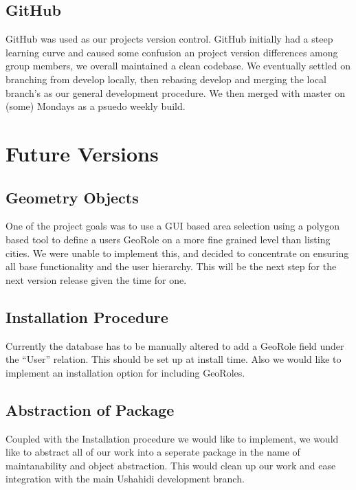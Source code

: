 \documentclass{article}
\begin{document}
\subsection{GitHub}
GitHub was used as our projects version control. GitHub initially had a steep learning curve and caused some confusion an project version differences among group members, we overall maintained a clean codebase. We eventually settled on branching from develop locally, then rebasing develop and merging the local branch's as our general development procedure. We then merged with master on (some) Mondays as a psuedo weekly build.

\section{Future Versions}
\subsection{Geometry Objects}
One of the project goals was to use a GUI based area selection using a polygon based tool to define a users GeoRole on a more fine grained level than listing cities. We were unable to implement this, and decided to concentrate on ensuring all base functionality and the user hierarchy. This will be the next step for the next version release given the time for one.

\subsection{Installation Procedure}
Currently the database has to be manually altered to add a GeoRole field under the ``User'' relation. This should be set up at install time. Also we would like to implement an installation option for including GeoRoles.

\subsection{Abstraction of Package}
Coupled with the Installation procedure we would like to implement, we would like to abstract all of our work into a seperate package in the name of maintanability and object abstraction. This would clean up our work and ease integration with the main Ushahidi development branch.
\end{document}
